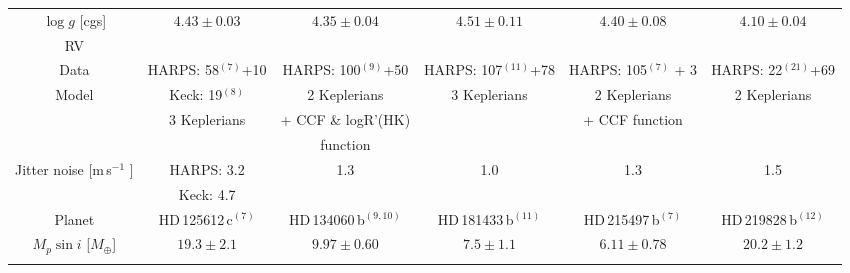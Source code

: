 \documentclass[traditabstract]{aa}
\newcommand{\ms}{\mbox{m\,s$^{-1}$} }
\begin{document}
\begin{appendix}
\begin{table*}
\begin{center}
{\begin{tabular}{cccccc}
$\log{g}$ [cgs]                     & $4.43 \pm 0.03$               & $4.35 \pm 0.04$                  & $4.51 \pm 0.11$                &  $4.40 \pm 0.08$                &   $4.10 \pm 0.04$                      \\ \noalign {\smallskip} 
\hline \noalign {\smallskip}
 RV      &  & & & &     \\ \noalign {\smallskip}
\hline \noalign {\smallskip}
  Data                                   & HARPS: 58$^{(7)}$+10      & HARPS: 100$^{(9)}$+50      & HARPS: 107$^{(11)}$+78    & HARPS: 105$^{(7)}$ + 3             & HARPS: 22$^{(21)}$+69 \\ \noalign {\smallskip}
  Model                                & Keck: 19$^{(8)}$                  & 2 Keplerians                         &  3 Keplerians                        & 2 Keplerians                                   & 2 Keplerians \\ \noalign {\smallskip} 
                                            &  3 Keplerians                        &  + CCF \& logR'(HK)              &                                               &  + CCF function                          &  \\ \noalign {\smallskip}  
                                            &                                              & function                                &                                              &                                                       & \\ \noalign {\smallskip} 
 Jitter noise [\ms]                 &  HARPS: 3.2                          &   1.3                                    & 1.0                                        &   1.3                                                 &  1.5  \\ \noalign {\smallskip} 
                                             & Keck: 4.7                               &                                            &                                              &                                                       &            \\ \noalign {\smallskip} 
\hline \noalign {\smallskip}                                           
Planet                                  & HD\,125612\,c$^{(7)}$             &    HD\,134060\,b$^{(9, 10)}$        & HD\,181433\,b$^{(11)}$          &  HD\,215497\,b$^{(7)}$                  & HD\,219828\,b$^{(12)}$  \\ \noalign {\smallskip}
\hline \noalign {\smallskip}
$M_p \sin{i}$ [$M_\oplus$]    & $19.3 \pm 2.1   $               & $9.97 \pm 0.60$                 & $7.5 \pm 1.1$                 &  $6.11 \pm 0.78$                            &$20.2 \pm 1.2$ \\ \noalign {\smallskip} 

\end{tabular}}
\end{center}
\end{table*}
\end{appendix}
\end{document}
